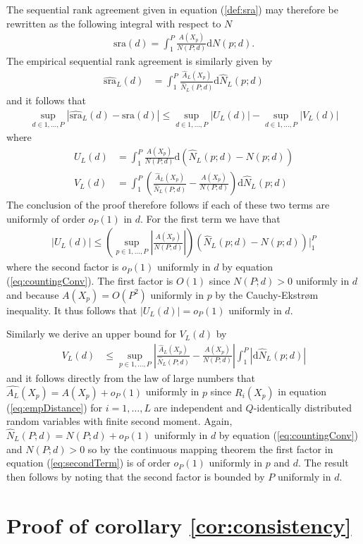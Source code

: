 \documentclass[12pt,a4paper]{article}
\theoremstyle{plain}
\begin{document}
The sequential rank agreement given in equation
(\ref{def:sra}) may therefore be rewritten as the following integral
with respect to $N$
\begin{align}
  \textrm{sra}(d) = \int_{1}^P \frac{A(X_p)}{N(P; d)}\mathrm dN(p; d).
\end{align}
The empirical sequential rank agreement is similarly given by
\begin{align}
  \widehat{\textrm{sra}}_L(d) &= \int_1^P \frac{\widehat{A}_L(X_p)}{\widehat{N}_L(P; d)}\mathrm d \widehat{N}_L(p; d) 
\end{align}
and it follows that
\begin{align}
  \sup_{d \in 1,\ldots,P}\left|\widehat{\textrm{sra}}_L(d) - \textrm{sra}(d)\right| \leq \sup_{d \in 1,\ldots,P}\left|U_L(d)\right| - \sup_{d \in 1,\ldots,P}\left|V_L(d)\right|
\end{align}
where
\begin{align}
  U_L(d) &= \int_1^P\frac{A(X_p)}{N(P;d)} \mathrm d\left(\widehat{N}_L(p; d) - N(p; d)\right)\\
  V_L(d) &=  \int_1^P \left(\frac{\widehat{A}_L(X_p)}{\widehat{N}_L(P; d)} - \frac{A(X_p)}{N(P;d)}\right)\mathrm d\widehat{N}_L(p; d)
\end{align}
The conclusion of the proof therefore follows if each of these two
terms are uniformly of order $o_P(1)$ in $d$.  For the first term we
have that
\begin{align}
  \left|U_L(d)\right| \leq \left(\sup_{p \in 1,\ldots,P}\left|\frac{A(X_p)}{N(P;d)}\right|\right)\left(\widehat{N}_L(p; d) - N(p; d)\right)\biggr\rvert_1^P
\end{align}
where the second factor is $o_P(1)$ uniformly in $d$ by equation
(\ref{eq:countingConv}). The first factor is $O(1)$ since $N(P;d)>0$
uniformly in $d$ and because $A(X_p) = O(P^2)$ uniformly in $p$ by the Cauchy-Ekstr{\o}m inequality. It
thus follows that $\left|U_L(d)\right| = o_P(1)$ uniformly in $d$.

Similarly we derive an upper bound for $V_L(d)$ by
\begin{align}
 V_L(d) &\leq \sup_{p \in 1,\ldots,P}\left|\frac{\widehat{A}_L(X_p)}{\widehat{N}_L(P; d)} - \frac{A(X_p)}{N(P;d)}\right| \int_1^P \left|\mathrm d\widehat{N}_L(p; d)\right|\label{eq:secondTerm}
\end{align}
and it follows directly from the law of large numbers that
$\widehat{A_L}(X_p) = A(X_p) + o_P(1)$ uniformly in $p$ since
$R_i(X_p)$ in equation (\ref{eq:empDistance}) for $i=1,\ldots,L$ are
independent and $Q$-identically distributed random variables with
finite second moment. Again, $\widehat{N}_L(P; d) = N(P;d) + o_P(1)$ uniformly in $d$ by equation
(\ref{eq:countingConv}) and $N(P;d)>0$ so by the continuous mapping theorem the first factor
in equation (\ref{eq:secondTerm}) is of order $o_P(1)$ uniformly in
$p$ and $d$. The result then follows by noting that the second factor
is bounded by $P$ uniformly in $d$.

\section{Proof of corollary \ref{cor:consistency}}
\end{document}
